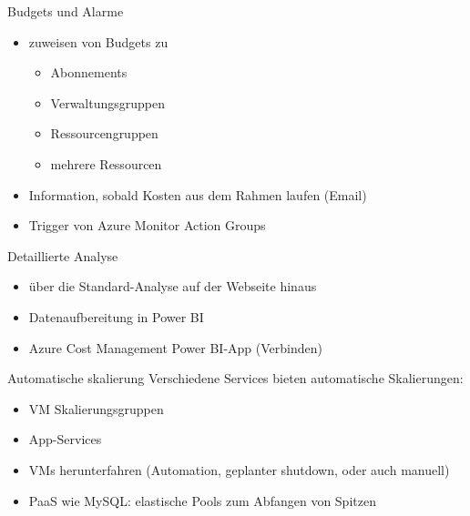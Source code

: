 \begin{flashcard}[Definition]{Budgets und Alarme}
  \begin{itemize}
    \item zuweisen von Budgets zu
      \begin{itemize}
        \item Abonnements
        \item Verwaltungsgruppen
        \item Ressourcengruppen
        \item mehrere Ressourcen
      \end{itemize}
    \item Information, sobald Kosten aus dem Rahmen laufen (Email)
    \item Trigger von Azure Monitor Action Groups
  \end{itemize}
\end{flashcard}

\begin{flashcard}[Definition]{Detaillierte Analyse}
  \begin{itemize}
    \item über die Standard-Analyse auf der Webseite hinaus
    \item Datenaufbereitung in Power BI
    \item Azure Cost Management Power BI-App (Verbinden)
  \end{itemize}
\end{flashcard}


\begin{flashcard}[Definition]{Automatische skalierung}
  Verschiedene Services bieten automatische Skalierungen:
  \begin{itemize}
    \item VM Skalierungsgruppen
    \item App-Services
    \item VMs herunterfahren (Automation, geplanter shutdown, oder auch manuell)
    \item PaaS wie MySQL: elastische Pools zum Abfangen von Spitzen
  \end{itemize}
\end{flashcard}

